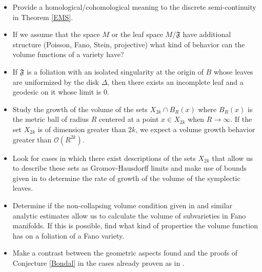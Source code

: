 \documentclass{article}
\begin{document}
\begin{itemize}
        \item Provide a homological/cohomological meaning to the discrete semi-continuity in Theorem \ref{EMS}.

        \item If we assume that the space $M$ or the leaf space $M/\mathfrak{F}$ have additional structure (Poisson, Fano, Stein, projective)
        what kind of behavior can the volume functions of a variety have?

        \item If $\mathfrak{F}$ is a foliation with an isolated singularity at the origin of $B$ whose leaves are uniformized by the disk $\Delta$,
        then there exists an incomplete leaf and a geodesic on it whose limit is $0$.

        \item Study the growth of the volume of the sets $X_{2k}\cap B_{R}(x)$ where $B_R(x)$ is the metric ball
        of radius $R$ centered at a point $x\in X_{2k}$ when $R\rightarrow\infty$. If the set $X_{2k}$ is
        of dimension greater than $2k$, we expect a volume growth behavior greater than $\mathcal{O}(R^{2k}).$

        \item Look for cases in which there exist descriptions of the sets $X_{2k}$ that allow us to describe these sets
        as Gromov-Hausdorff limits and make use of bounds given in \cite{D-SS} to determine the rate of growth
        of the volume of the symplectic leaves.

        \item Determine if the non-collapsing volume condition given in \cite{D-SS} and similar analytic estimates
        allow us to calculate the volume of subvarieties in Fano manifolds. If this is possible, find
        what kind of properties the volume function has on a foliation of a Fano variety.

        \item Make a contrast between the geometric aspects found and the proofs of Conjecture \ref{Bondal} in the
        cases already proven as in \cite{Gua-Pym}.

\end{itemize}
\end{document}
